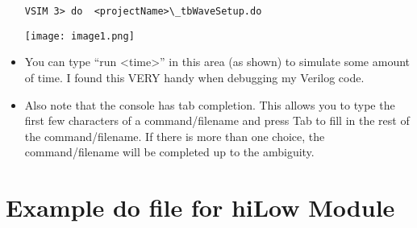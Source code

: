 \begin{itemize}
\begin{verbatim}
VSIM 3> do  <projectName>\_tbWaveSetup.do
\end{verbatim}

        \texttt{[image: image1.png]}

    \item
        You can type ``run \textless time\textgreater'' in this area (as
        shown) to simulate some amount of time. I found this VERY handy when
        debugging my Verilog code.
    \item
        Also note that the console has tab completion. This allows you to type
        the first few characters of a command/filename and press Tab to fill
        in the rest of the command/filename. If there is more than one choice,
        the command/filename will be completed up to the ambiguity.
\end{itemize}

\section{Example do file for hiLow Module}

